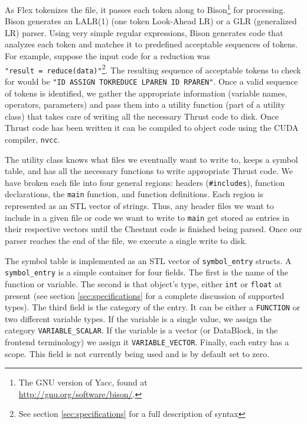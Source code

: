 \documentclass[twocolumn]{article}
\renewcommand{\|}{\origbar} %
\newcommand{\code}[1]{\texttt{#1}}
\begin{document}
As Flex tokenizes the file, it passes each token along to Bison\footnote{The GNU version of Yacc, found at \\ \url{http://gnu.org/software/bison/}.} for processing. Bison generates an LALR(1) (one token Look-Ahead LR) or a GLR (generalized LR) parser. Using very simple regular expressions, Bison generates code that analyzes each token and matches it to predefined acceptable sequences of tokens. For example, suppose the input code for a reduction was \code{"result~=~reduce(data)"}\footnote{See section \ref{sec:specifications} for a full description of syntax}. The resulting sequence of acceptable tokens to check for would be \code{"ID~ASSIGN~TOKREDUCE~LPAREN~ID~RPAREN"}. Once a valid sequence of tokens is identified, we gather the appropriate information (variable names, operators, parameters) and pass them into a utility function (part of a utility class) that takes care of writing all the necessary Thrust code to disk. Once Thrust code has been written it can be compiled to object code using the CUDA compiler, \code{nvcc}.

The utility class knows what files we eventually want to write to, keeps a symbol table, and has all the necessary functions to write appropriate Thrust code. We have broken each file into four general regions: headers (\code{\#includes}), function declarations, the \code{main} function, and function definitions. Each region is represented as an STL vector of strings. Thus, any header files we want to include in a given file or code we want to write to \code{main} get stored as entries in their respective vectors until the Chestnut code is finished being parsed. Once our parser reaches the end of the file, we execute a single write to disk.

The symbol table is implemented as an STL vector of \code{symbol\_entry} structs. A \code{symbol\_entry} is a simple container for four fields. The first is the name of the function or variable. The second is that object's type, either \code{int} or \code{float} at present (see section \ref{sec:specifications} for a complete discussion of supported types). The third field is the category of the entry. It can be either a \code{FUNCTION} or two different variable types. If the variable is a single value, we assign the category \code{VARIABLE\_SCALAR}. If the variable is a vector (or DataBlock, in the frontend terminology) we assign it \code{VARIABLE\_VECTOR}. Finally, each entry has a scope. This field is not currently being used and is by default set to zero. 
\end{document}
